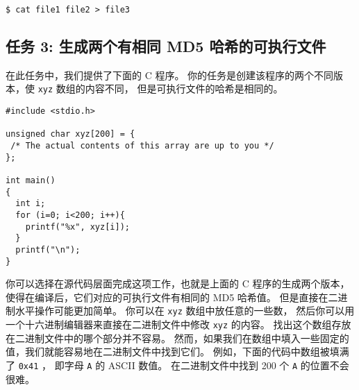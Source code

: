 \begin{lstlisting}
$ cat file1 file2 > file3
\end{lstlisting}






\subsection{任务 3: 生成两个有相同 MD5 哈希的可执行文件}

在此任务中，我们提供了下面的 C 程序。
你的任务是创建该程序的两个不同版本，使 \texttt{xyz} 数组的内容不同，
但是可执行文件的哈希是相同的。


\begin{lstlisting}
#include <stdio.h>

unsigned char xyz[200] = {
 /* The actual contents of this array are up to you */
};

int main()
{
  int i;
  for (i=0; i<200; i++){
    printf("%x", xyz[i]);
  }
  printf("\n");
}
\end{lstlisting}


你可以选择在源代码层面完成这项工作，也就是上面的 C 程序的生成两个版本，
使得在编译后，它们对应的可执行文件有相同的 MD5 哈希值。
但是直接在二进制水平操作可能更加简单。
你可以在 \texttt{xyz} 数组中放任意的一些数，
然后你可以用一个十六进制编辑器来直接在二进制文件中修改 \texttt{xyz} 的内容。
找出这个数组存放在二进制文件中的哪个部分并不容易。
然而，如果我们在数组中填入一些固定的值，我们就能容易地在二进制文件中找到它们。
例如，下面的代码中数组被填满了 \texttt{0x41} ， 即字母 \texttt{A} 的 ASCII 数值。
在二进制文件中找到 200 个 \texttt{A} 的位置不会很难。

